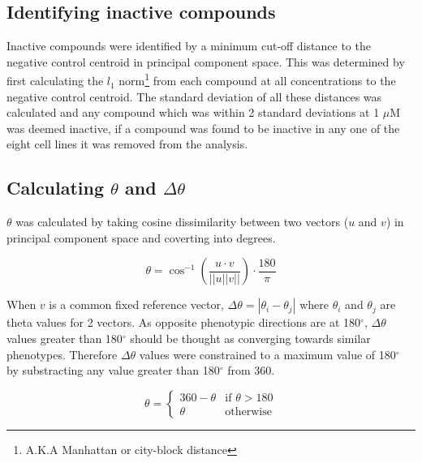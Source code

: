 \documentclass[a4paper,11pt,twoside,openright]{scrbook}
\begin{document}
\subsection{Identifying inactive compounds}

Inactive compounds were identified by a minimum cut-off distance to the negative control centroid in principal component space.
This was determined by first calculating the $l_1$ norm\footnote{A.K.A Manhattan or city-block distance} from each compound at all concentrations to the negative control centroid.
The standard deviation of all these distances was calculated and any compound which was within 2 standard deviations at 1 $\mu$M was deemed inactive, if a compound was found to be inactive in any one of the eight cell lines it was removed from the analysis.


\subsection{Calculating $\theta$ and $\Delta\theta$}

$\theta$ was calculated by taking cosine dissimilarity between two vectors ($u$ and $v$) in principal component space and coverting into degrees.

\begin{equation} \label{equation:theta}
        \theta = \cos^{-1} \left( \frac{u \cdot v}{||u||v||} \right) \cdot \frac{180}{\pi}
\end{equation}

When $v$ is a common fixed reference vector, $\Delta\theta = |\theta_i - \theta_j|$ where $\theta_i$ and $\theta_j$ are theta values for 2 vectors.
As opposite phenotypic directions are at 180$^\circ$, $\Delta\theta$ values greater than 180$^\circ$ should be thought as converging towards similar phenotypes.
Therefore $\Delta\theta$ values were constrained to a maximum value of 180$^\circ$ by substracting any value greater than 180$^\circ$ from 360.

\begin{equation}
\theta = 
    \begin{cases}
        360 - \theta & \text{if } \theta > 180\\
        \theta       & \text{otherwise}
    \end{cases}
\end{equation}
\end{document}
